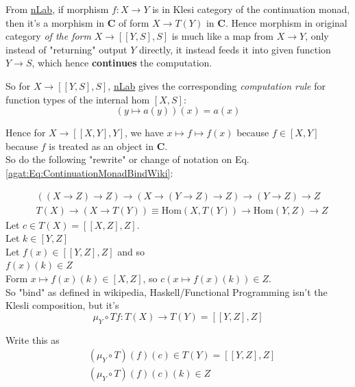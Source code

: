 From \href{https://ncatlab.org/nlab/show/continuation+monad}{nLab}, if morphism $f:X\to Y$ is in Klesi category of the continuation monad, then it's a morphism in $\mathbf{C}$ of form $X\to T(Y)$ in $\mathbf{C}$. Hence morphism in original category \emph{of the form} $X\to [[Y,S], S]$ is much like a map from $X \to Y$, only instead of "returning" output $Y$ directly, it instead feeds it into given function $Y\to S$, which hence \textbf{continues} the computation. 

So for $X \to [[Y, S], S]$, \href{https://ncatlab.org/nlab/show/internal+hom}{nLab} gives the corresponding \emph{computation rule} for function types of the internal hom $[X, S]$:
\[
(y \mapsto a(y))(x) = a(x)
\]

Hence for $X \to [[X, Y], Y]$, we have $x\mapsto f \mapsto f(x)$ because $f \in [X, Y]$ because $f$ is treated as an object in $\mathbf{C}$. \\

So do the following "rewrite" or change of notation on Eq. \ref{agat:Eq:ContinuationMonadBindWiki}:

\begin{equation}\label{agat:Eq:ContinuationMonadBindWiki2}
\begin{aligned}
& ((X \to Z) \to Z) \to (X \to (Y\to Z) \to Z) \to (Y \to Z) \to Z \\ 
& T(X) \to (X \to T(Y)) \equiv \text{Hom}(X, T(Y)) \to \text{Hom}(Y,Z) \to Z
\end{aligned}
\end{equation}
Let $c\in T(X) = [[X,Z], Z]$. \\
Let $k \in [Y,Z]$ \\
Let $f(x) \in [[Y,Z], Z]$ and so \\
$f(x)(k) \in Z$ \\

Form $x \mapsto f(x)(k) \in [X,Z]$, so $c(x\mapsto f(x)(k)) \in Z$. \\

So "bind" as defined in wikipedia, Haskell/Functional Programming isn't the Klesli composition, but it's
\[
\mu_Y \circ Tf : T(X) \to T(Y) = [[Y,Z], Z]
\]

Write this as 
\begin{equation}
\boxed{
\begin{aligned}
& (\mu_Y \circ T)(f)(c) \in T(Y) = [[Y,Z], Z] \\
& (\mu_Y \circ T)(f)(c)(k) \in Z
\end{aligned}}
\end{equation}


